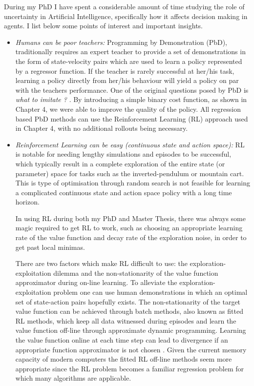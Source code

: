 During my PhD I have spent a considerable amount of time studying the role 
of uncertainty in Artificial Intelligence, specifically how it affects 
decision making in agents. I list below some points of interest and important 
insights.

\begin{itemize}

 \item \textit{Humans can be poor teachers:}  Programming by Demonstration (PbD), traditionally requires an expert 
 teacher to provide a set of demonstrations in the form of state-velocity pairs which are used to learn 
 a policy represented by a regressor function. If the teacher is rarely successful at her/his task, learning a policy
 directly from her/his behaviour will yield a policy on par with the teachers performance.
 One of the original questions posed by PbD is \textit{what to imitate ?} \citep{Billard08chapter}.
 By introducing a simple binary cost function, as shown in Chapter 4, we were able to improve the quality of the policy.
 All regression based PbD methods can use the Reinforcement Learning (RL) approach used in Chapter 4, with no additional 
 rollouts being necessary.
 
 \item \textit{Reinforcement Learning can be easy (continuous state and action space):} 
 RL is notable for needing lengthy simulations and episodes to be successful, which typically result in 
 a complete exploration of the entire state (or parameter) space for tasks
 such as the inverted-pendulum or mountain cart.  This is type of optimisation through random search is not feasible for learning a complicated continuous state 
 and action space policy with a long time horizon.
 
 In using RL during both my PhD and Master Thesis, there was always some magic required
 to get RL to work, such as choosing an appropriate learning rate of the value function 
 and decay rate of the exploration noise, in order to get past local minimas. 
 
 There are two factors which make RL difficult to use: the exploration-exploitation 
 dilemma and the non-stationarity of the value function approximator during on-line learning.
 To alleviate the exploration-exploitation problem one can use human demonstrations 
 in which an optimal set of state-action pairs hopefully exists. The non-stationarity
 of the target value function can be achieved through batch methods, also known as fitted RL methods, which 
 keep all data witnessed during episodes and learn the value function off-line through 
 approximate dynamic programming. 
 Learning the value function online at each time step can lead to divergence if an appropriate 
 function approximator is not chosen \cite[p. 51]{RL_book_2010}. Given the current memory capacity 
 of modern computers the fitted RL off-line methods seem more appropriate since the RL problem
 becomes a familiar regression problem for which many algorithms are applicable.
 

\end{itemize}
